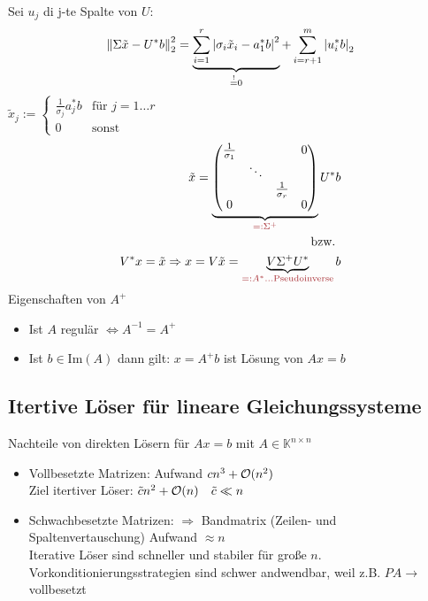 Sei $u_j$ di j-te Spalte von $U$:
\begin{align*}
  \left\lVert \Sigma \tilde{x} - U^*b \right\rVert_2^2 = \underbrace{\sum^{r}_{i=1} \left| \sigma_i \tilde{x}_i - a_1^* b \right|^2}_{\overset{!}{=} 0} + \sum^{m}_{i=r+1} \left| u_i^* b \right|_2
\end{align*}
 $\tilde{x}_j := \begin{cases}
    \frac{1}{\sigma_j} a_j^*b &\mbox{für } j =1\ldots r\\
     0 &\mbox{sonst}
  \end{cases}$
\begin{align*}
  \tilde{x} = \underbrace{\begin{pmatrix}
        \frac{1}{\sigma_1} &        &          & 0 \\
                 & \ddots &          &   \\
                 &        & \frac{1}{\sigma_r} &   \\
        0        &        &          & 0
      \end{pmatrix}}_{\textcolor{rot}{=: \Sigma^+}} U^*b \\
  \text{ bzw. } \\
  V^* x = \tilde{x} \Rightarrow x = V\tilde{x} = \underbrace{V\Sigma^+U^*}_{\textcolor{rot}{=: A^*\ldots\text{Pseudoinverse}}}b
\end{align*}
Eigenschaften von $A^+$
\begin{itemize}
  \item Ist $A$ regulär $\Leftrightarrow A^{-1} = A^+$
  \item Ist $b \in \mathrm{Im}(A)$ dann gilt: $x = A^+ b$ ist Lösung von $Ax = b$
\end{itemize}

\subsection{Itertive Löser für lineare Gleichungssysteme}
Nachteile von direkten Lösern für $Ax=b$ mit $A \in \mathbb{K}^{n \times n}$
\begin{itemize}
  \item Vollbesetzte Matrizen: Aufwand $cn^3 + \mathcal{O}(n^2)$ \\ Ziel itertiver Löser: $\tilde{c} n^2 + \mathcal{O}(n) \quad \tilde{c} \ll n$
  \item Schwachbesetzte Matrizen: $\Rightarrow$ Bandmatrix (Zeilen- und Spaltenvertauschung) Aufwand $\approx n$\\
    Iterative Löser sind schneller und stabiler für große $n$. Vorkonditionierungsstrategien sind schwer andwendbar, weil z.B. $PA \rightarrow$ vollbesetzt
\end{itemize}

